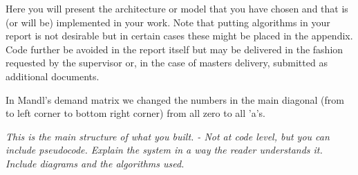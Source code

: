 Here you will present the architecture or model that you have chosen and that is (or will be) implemented in your work. Note that putting algorithms in your report is not desirable but in certain cases these might be placed in the appendix. Code further be avoided in the report itself but may be delivered in the fashion requested by the supervisor or, in the case of masters delivery, submitted as additional documents. 

In Mandl's demand matrix we changed the numbers in the main diagonal (from to left corner to bottom right corner) from all zero to all 'a's. 

\textit{This is the main structure of what you built.
- Not at code level, but you can include pseudocode.
Explain the system in a way the reader understands it.
Include diagrams and the algorithms used.}













